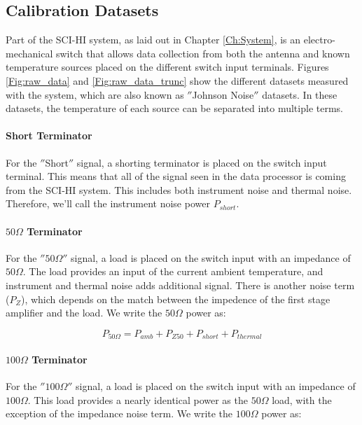 \subsection{Calibration Datasets} \label{Sec:calsource}

Part of the SCI-HI system, as laid out in Chapter \ref{Ch:System}, is an electro-mechanical switch that allows data collection from both the antenna and known temperature sources placed on the different switch input terminals. Figures \ref{Fig:raw_data} and \ref{Fig:raw_data_trunc} show the different datasets measured with the system, which are also known as $''$Johnson Noise$''$ datasets. In these datasets, the temperature of each source can be separated into multiple terms. 

\paragraph{Short Terminator}

For the $''$Short$''$ signal, a shorting terminator is placed on the switch input terminal. This means that all of the signal seen in the data processor is coming from the SCI-HI system. This includes both instrument noise and thermal noise. Therefore, we'll call the instrument noise power $P_{short}$.

\paragraph{$50 \Omega$ Terminator}

For the $'' 50 \Omega ''$ signal, a load is placed on the switch input with an impedance of $50 \Omega$. The load provides an input of the current ambient temperature, and instrument and thermal noise adds additional signal. There is another noise term ($P_Z$), which depends on the match between the impedence of the first stage amplifier and the load. We write the $50 \Omega$ power as:

\begin{equation}
P_{50 \Omega} = P_{amb}+P_{Z50}+P_{short}+P_{thermal}
\end{equation}

\paragraph{$100 \Omega$ Terminator}

For the $'' 100 \Omega ''$ signal, a load is placed on the switch input with an impedance of $100 \Omega$. This load provides a nearly identical power as the $50 \Omega$ load, with the exception of the impedance noise term. We write the $100 \Omega$ power as:

